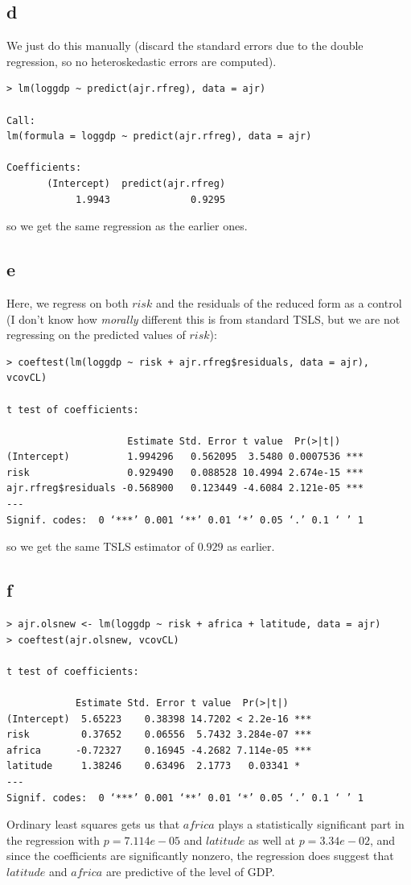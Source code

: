 \documentclass[12pt,letterpaper]{article}
\theoremstyle{definition}
\begin{document}
\subsection*{d}

We just do this manually (discard the standard errors due to the double regression, so no heteroskedastic errors are computed).
\begin{Verbatim}[fontsize=\small]
> lm(loggdp ~ predict(ajr.rfreg), data = ajr)

Call:
lm(formula = loggdp ~ predict(ajr.rfreg), data = ajr)

Coefficients:
       (Intercept)  predict(ajr.rfreg)
            1.9943              0.9295

\end{Verbatim}
so we get the same regression as the earlier ones.

\subsection*{e}

Here, we regress on both $risk$ and the residuals of the reduced form as a control (I don't know how \textit{morally} different this is from standard TSLS, but we are not regressing on the predicted values of $risk$):
\begin{Verbatim}[fontsize=\small]
> coeftest(lm(loggdp ~ risk + ajr.rfreg$residuals, data = ajr), vcovCL)

t test of coefficients:

                     Estimate Std. Error t value  Pr(>|t|)
(Intercept)          1.994296   0.562095  3.5480 0.0007536 ***
risk                 0.929490   0.088528 10.4994 2.674e-15 ***
ajr.rfreg$residuals -0.568900   0.123449 -4.6084 2.121e-05 ***
---
Signif. codes:  0 ‘***’ 0.001 ‘**’ 0.01 ‘*’ 0.05 ‘.’ 0.1 ‘ ’ 1
\end{Verbatim}
so we get the same TSLS estimator of $0.929$ as earlier.

\subsection*{f}

\begin{Verbatim}[fontsize=\small]
> ajr.olsnew <- lm(loggdp ~ risk + africa + latitude, data = ajr)
> coeftest(ajr.olsnew, vcovCL)

t test of coefficients:

            Estimate Std. Error t value  Pr(>|t|)
(Intercept)  5.65223    0.38398 14.7202 < 2.2e-16 ***
risk         0.37652    0.06556  5.7432 3.284e-07 ***
africa      -0.72327    0.16945 -4.2682 7.114e-05 ***
latitude     1.38246    0.63496  2.1773   0.03341 *
---
Signif. codes:  0 ‘***’ 0.001 ‘**’ 0.01 ‘*’ 0.05 ‘.’ 0.1 ‘ ’ 1
\end{Verbatim}
Ordinary least squares gets us that $africa$ plays a statistically significant part in the regression with $p = 7.114e-05$ and $latitude$ as well at $p = 3.34e-02$, and since the coefficients are significantly nonzero, the regression does suggest that $latitude$ and $africa$ are predictive of the level of GDP.
\end{document}
